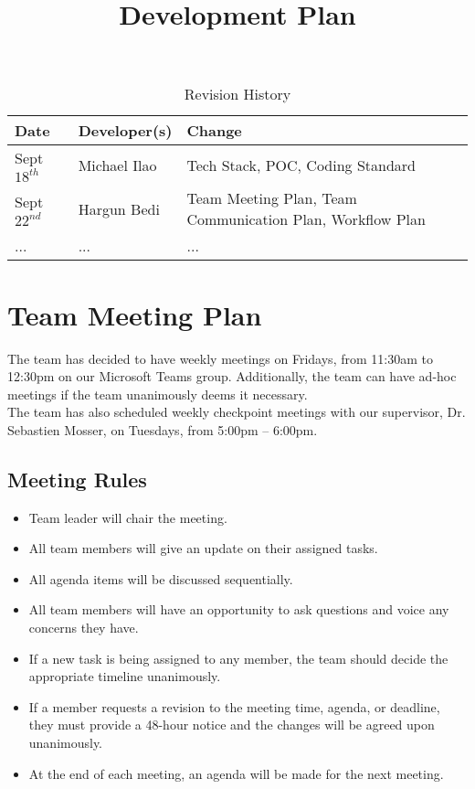 \documentclass{article}
\title{Development Plan\\\progname}
\author{\authname}
\date{}
\begin{document}
\begin{table}[hp]
\caption{Revision History} \label{TblRevisionHistory}
\begin{tabularx}{\textwidth}{llX}
\toprule
\textbf{Date} & \textbf{Developer(s)} & \textbf{Change}\\
\midrule
Sept $18^{th}$ & Michael Ilao & Tech Stack, POC, Coding Standard\\
Sept $22^{nd}$ & Hargun Bedi & Team Meeting Plan, Team Communication Plan, Workflow Plan\\
... & ... & ...\\
\bottomrule
\end{tabularx}
\end{table}

\newpage

\maketitle


\section{Team Meeting Plan}
The team has decided to have weekly meetings on Fridays, from 11:30am to 12:30pm on our Microsoft Teams group. Additionally, the team can have ad-hoc meetings if the team unanimously deems it necessary. 
\\The team has also scheduled weekly checkpoint meetings with our supervisor, Dr. Sebastien Mosser, on Tuesdays, from 5:00pm – 6:00pm. 
\subsection{Meeting Rules}
\begin{itemize}
    \item Team leader will chair the meeting.
    \item All team members will give an update on their assigned tasks.
    \item All agenda items will be discussed sequentially.
    \item All team members will have an opportunity to ask questions and voice any concerns they have.
    \item If a new task is being assigned to any member, the team should decide the appropriate timeline unanimously. 
    \item If a member requests a revision to the meeting time, agenda, or deadline, they must provide a 48-hour notice and the changes will be agreed upon unanimously.
    \item At the end of each meeting, an agenda will be made for the next meeting. 

\end{itemize}
\end{document}

